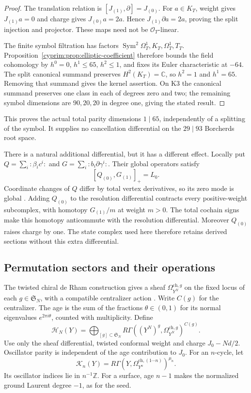 \begin{proof}
The translation relation is
$[J_{(1)},\partial]=J_{(0)}$. For $a\in K_T$,
weight gives $J_{(1)}a=0$ and charge gives
$J_{(0)}a=2a$. Hence $J_{(1)}\partial a=2a$,
proving the split injection and projector. These
maps need not be $\mathcal O_T$-linear.

The finite symbol filtration has factors
$\operatorname{Sym}^2\Omega_T^1,K_T,\Omega_T^1,T_T$.
Proposition~\ref{cyprim:prop:elliptic-coefficient}
therefore bounds the field cohomology by
$h^0=0$, $h^1\le65$, $h^2\le1$, and fixes its
Euler characteristic at $-64$. The split canonical
summand preserves $H^2(K_T)=\mathbb C$, so
$h^2=1$ and $h^1=65$. Removing that summand gives
the kernel assertion. On K3 the canonical summand
preserves one class in each of degrees zero and two;
the remaining symbol dimensions are $90,20,20$
in degree one, giving the stated result.
\end{proof}

This proves the actual total parity dimensions
$1\mid65$, independently of a splitting of the
symbol. It supplies no cancellation differential
on the $29\mid93$ Borcherds root space.

There is a natural additional differential, but it
has a different effect. Locally put
$Q=\sum_i:\beta_i c^i:$ and
$G=\sum_i:b_i\partial\gamma^i:$.
Their global operators satisfy
\begin{equation}\label{cyprim:eq:CDR-BRST}
 [Q_{(0)},G_{(1)}]_+=L_0.
\end{equation}
Coordinate changes of $Q$ differ by total vertex
derivatives, so its zero mode is global
\cite[\S~4]{rewriteMSV1999}.
Adding $Q_{(0)}$ to the resolution differential
contracts every positive-weight subcomplex, with
homotopy $G_{(1)}/m$ at weight $m>0$. The total
cochain signs make this homotopy anticommute with
the resolution differential. Moreover $Q_{(0)}$
raises charge by one. The state complex used here
therefore retains derived sections without this
extra differential.

\subsection{Permutation sectors and their operations}

The twisted chiral de Rham construction gives a
sheaf $\Omega_{Y^N}^{\mathrm{ch},g}$ on the fixed
locus of each $g\in\mathfrak S_N$, with a compatible
centralizer action \cite{rewriteFS2007}. Write $C(g)$
for the centralizer. The age is the sum of the fractions
$\theta\in(0,1)$ for its normal eigenvalues $e^{2\pi i\theta}$,
counted with multiplicity. Define
\begin{equation}\label{cyprim:eq:twisted-states}
 \mathcal H_N(Y)=\bigoplus_{[g]\subset\mathfrak S_N}
 R\Gamma((Y^N)^g,\Omega_{Y^N}^{\mathrm{ch},g})^{C(g)}.
\end{equation}
Use only the sheaf differential, twisted conformal
weight and charge $J_0-Nd/2$. Oscillator parity is
independent of the age contribution to $J_0$.
For an $n$-cycle, let
\[
 \mathcal K_n(Y)=
 R\Gamma(Y,\Omega_{Y^n}^{\mathrm{ch},(1\cdots n)})^{\mu_n}.
\]
Its oscillator indices lie in $n^{-1}\mathbb Z$.
For a surface, age $n-1$ makes the normalized
ground Laurent degree $-1$, as for the seed.

